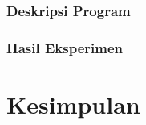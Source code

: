 \todo{}

\subsubsection{Deskripsi Program}

\todo{}

\subsubsection{Hasil Eksperimen}

\todo{}

\section{Kesimpulan}

\todo{}
